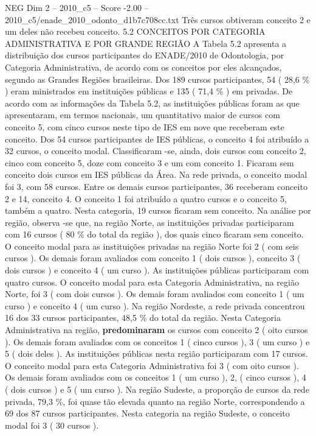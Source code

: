 \begin{textsample}{NEG Dim 2 – 2010\_c5 – Score -2.00 – 2010\_c5/enade\_2010\_odonto\_d1b7c708cc.txt}
Três cursos obtiveram conceito 2 e um deles não recebeu conceito. 5.2 CONCEITOS POR CATEGORIA ADMINISTRATIVA E POR GRANDE REGIÃO A Tabela 5.2 apresenta a distribuição dos cursos participantes do ENADE/2010 de Odontologia, por Categoria Administrativa, de acordo com os conceitos por eles alcançados, segundo as Grandes Regiões brasileiras.
Dos 189 cursos participantes, 54 ( 28,6 \% ) eram ministrados em instituições públicas e 135 ( 71,4 \% ) em privadas.
De acordo com as informações da Tabela 5.2, as instituições públicas foram as que apresentaram, em termos nacionais, um quantitativo maior de cursos com conceito 5, com cinco cursos neste tipo de IES em nove que receberam este conceito.
Dos 54 cursos participantes de IES públicas, o conceito 4 foi atribuído a 32 cursos, o conceito modal.
Classificaram -se, ainda, dois cursos com conceito 2, cinco com conceito 5, doze com conceito 3 e um com conceito 1.
Ficaram sem conceito dois cursos em IES públicas da Área.
Na rede privada, o conceito modal foi 3, com 58 cursos.
Entre os demais cursos participantes, 36 receberam conceito 2 e 14, conceito 4.
O conceito 1 foi atribuído a quatro cursos e o conceito 5, também a quatro.
Nesta categoria, 19 cursos ficaram sem conceito.
Na análise por região, observa -se que, na região Norte, as instituições privadas participaram com 16 cursos ( 80 \% do total da região ), dos quais cinco ficaram sem conceito.
O conceito modal para as instituições privadas na região Norte foi 2 ( com seis cursos ).
Os demais foram avaliados com conceito 1 ( dois cursos ), conceito 3 ( dois cursos ) e conceito 4 ( um curso ).
As instituições públicas participaram com quatro cursos.
O conceito modal para esta Categoria Administrativa, na região Norte, foi 3 ( com dois cursos ).
Os demais foram avaliados com conceito 1 ( um curso ) e conceito 4 ( um curso ).
Na região Nordeste, a rede privada concentrou 16 dos 33 cursos participantes, 48,5 \% do total da região.
Nesta Categoria Administrativa na região, \textbf{predominaram} os cursos com conceito 2 ( oito cursos ).
Os demais foram avaliados com os conceitos 1 ( cinco cursos ), 3 ( um curso ) e 5 ( dois deles ).
As instituições públicas nesta região participaram com 17 cursos.
O conceito modal para esta Categoria Administrativa foi 3 ( com oito cursos ).
Os demais foram avaliados com os conceitos 1 ( um curso ), 2, ( cinco cursos ), 4 ( dois cursos ) e 5 ( um curso ).
Na região Sudeste, a proporção de cursos da rede privada, 79,3 \%, foi quase tão elevada quanto na região Norte, correspondendo a 69 dos 87 cursos participantes.
Nesta categoria na região Sudeste, o conceito modal foi 3 ( 30 cursos ).

\end{textsample}
